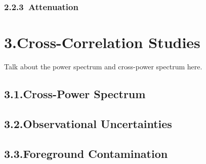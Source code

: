 \documentclass[12pt]{article}
\begin{document}
			

		\tocless\subsubsection{\hypertarget{subsubsec:methods}{2.2.3\hspace{0.75em}\lya\ Attenuation}}

			

\newpage


\tocless\section{\hypertarget{sec:results}{3.\hspace{0.75em}Cross-Correlation Studies}}

\vspace{50pt}

Talk about the power spectrum and cross-power spectrum here.

	\tocless\subsection{\hypertarget{subsec:results}{3.1.\hspace{0.75em}Cross-Power Spectrum}}

		

	\tocless\subsection{\hypertarget{subsec:results}{3.2.\hspace{0.75em}Observational Uncertainties}}

		

	\tocless\subsection{\hypertarget{subsec:results}{3.3.\hspace{0.75em}Foreground Contamination}}
\end{document}
